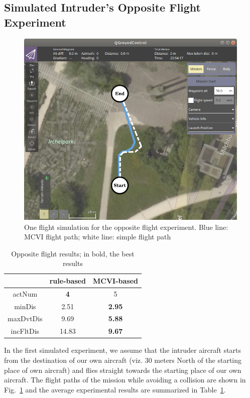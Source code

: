 \documentclass[orivec]{llncs}
\begin{document}
\subsection{Simulated Intruder's Opposite Flight Experiment}
\label{ssec:oppositeFlight}

\begin{figure}[t]
    \centering
	\includegraphics[width=0.95\linewidth]{oppositeFlightSimulation.jpg} 
	\caption{One flight simulation for the opposite flight experiment. Blue line: MCVI flight path; white line: simple flight path}
	\label{fig:oppositeFlightSimulation}
\end{figure}

\begin{table}[t]
	\caption{Opposite flight results; in bold, the best results}
	\label{tab:oppositeFlightResults}
	\centering
	\begin{tabular}{c|c|c}
		& rule-based & MCVI-based\\
		\hline 
		actNum & \textbf{4} & 5\\
		minDis & 2.51 & \textbf{2.95} \\
		maxDvtDis & 9.69 & \textbf{5.88} \\
		incFltDis & 14.83 & \textbf{9.67}\\
	\end{tabular}
\end{table}

In the first simulated experiment, we assume that the intruder aircraft starts from the destination of our own aircraft (viz. 30 meters North of the starting place of own aircraft) and flies straight towards the starting place of our own aircraft.
The flight paths of the mission while avoiding a collision are shown in Fig.~\ref{fig:oppositeFlightSimulation} and the average experimental results are summarized in Table~\ref{tab:oppositeFlightResults}.
\end{document}
